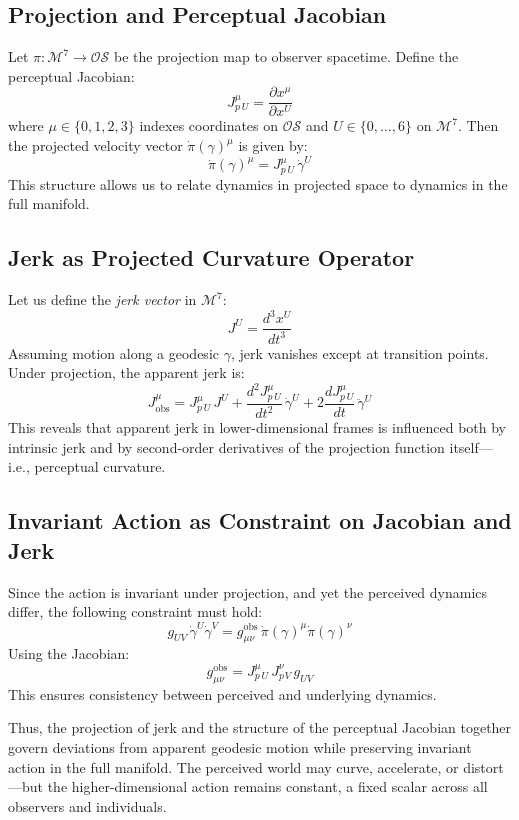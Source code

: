 \documentclass{article}
\begin{document}
\subsection{Projection and Perceptual Jacobian}

Let \( \pi : \mathcal{M}^7 \to \mathcal{OS} \) be the projection map to observer spacetime. Define the perceptual Jacobian:
\[
J_p^{\mu}{}_U = \frac{\partial x^{\mu}}{\partial x^U}
\]
where \( \mu \in \{0,1,2,3\} \) indexes coordinates on \( \mathcal{OS} \) and \( U \in \{0,\dots,6\} \) on \( \mathcal{M}^7 \). Then the projected velocity vector \( \dot{\pi}(\gamma)^\mu \) is given by:
\[
    \dot{\pi}(\gamma)^\mu = J_p^{\mu}{}_U \, \dot{\gamma}^U
\]
This structure allows us to relate dynamics in projected space to dynamics in the full manifold.

\subsection{Jerk as Projected Curvature Operator}

Let us define the \textit{jerk vector} in \( \mathcal{M}^7 \):
\[
    J^U = \frac{d^3 x^U}{dt^3}
\]
Assuming motion along a geodesic \( \gamma \), jerk vanishes except at transition points. Under projection, the apparent jerk is:
\[
    J^{\mu}_{\text{obs}} = J_p^{\mu}{}_U \, J^U + \frac{d^2 J_p^{\mu}{}_U}{dt^2} \, \dot{\gamma}^U + 2 \frac{d J_p^{\mu}{}_U}{dt} \, \ddot{\gamma}^U
\]
This reveals that apparent jerk in lower-dimensional frames is influenced both by intrinsic jerk and by second-order derivatives of the projection function itself—i.e., perceptual curvature.

\subsection{Invariant Action as Constraint on Jacobian and Jerk}

Since the action is invariant under projection, and yet the perceived dynamics differ, the following constraint must hold:
\[
    g_{UV} \, \dot{\gamma}^U \dot{\gamma}^V = g_{\mu\nu}^{\text{obs}} \, \dot{\pi}(\gamma)^\mu \dot{\pi}(\gamma)^\nu
\]
Using the Jacobian:
\[
    g_{\mu\nu}^{\text{obs}} = J_p^{\mu}{}_U \, J_p^{\nu}{}_V \, g_{UV}
\]
This ensures consistency between perceived and underlying dynamics.

Thus, the projection of jerk and the structure of the perceptual Jacobian together govern deviations from apparent geodesic motion while preserving invariant action in the full manifold. The perceived world may curve, accelerate, or distort—but the higher-dimensional action remains constant, a fixed scalar across all observers and individuals.
\end{document}
